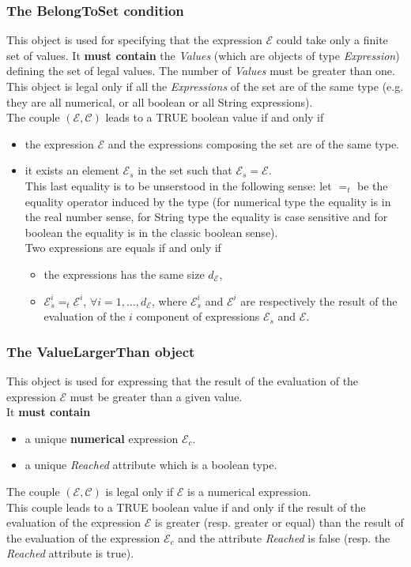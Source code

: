 \documentclass[a4paper,11pt] {article}
\begin{document}
\subsubsection{The BelongToSet condition}\label{par-BelongToSet}
This object is used for specifying that the expression $\mathcal E$ could take only a finite set of values. 
It {\bf must contain} the {\it Values} (which are objects of type {\it Expression})  
defining the set of legal values. The number of {\it Values} must be greater than one.\\
This object is legal only if all the {\it Expressions} of the set are of the same type (e.g. they are all numerical, or all boolean or all String expressions).\\
The couple $(\mathcal E, \mathcal C)$ leads to a TRUE boolean value if and only if 
\begin{itemize}
\item the expression $\mathcal E$ and the expressions composing the set are of the same type.
\item it exists an element $\mathcal E_s$ in the set such that $\mathcal E_s = \mathcal E$.\\
This last equality is to be unserstood in 
the following sense: let $=_t$ be the equality operator induced by the type (for numerical type the equality is in the real number sense, for String type the equality is case sensitive and for boolean the equality is in the classic boolean sense).\\
Two expressions are equals if and only if
\begin{itemize}
\item the expressions has the same size $d_{\mathcal E}$,
\item $\mathcal E_s^i =_t \mathcal E^i$, $\forall i =1,...,d_{\mathcal E}$, where $\mathcal E_s^i$ and $ \mathcal E^i$ are respectively the result of the evaluation of the 
$i$ component of expressions $\mathcal E_s$ and $\mathcal E$. 
\end{itemize}
\end{itemize}

\subsubsection{The ValueLargerThan object}
This object is used for expressing that the result of the evaluation of the expression $\mathcal E$ 
must be greater than a given value.\\
It {\bf must contain}
\begin{itemize}
\item a unique {\bf numerical} expression $\mathcal E_c$. 
\item a unique {\it Reached} attribute which is a boolean type.
\end{itemize}
The couple $(\mathcal E, \mathcal C)$ is legal only if $\mathcal E$ is a numerical expression.\\
This couple leads to a TRUE boolean value if and only if 
the result of the evaluation of the expression $\mathcal E$ is greater (resp. greater or equal) than the result of the evaluation of the expression $\mathcal E_c$ and the attribute {\it Reached} is false (resp. the {\it Reached} attribute is true).
\end{document}
